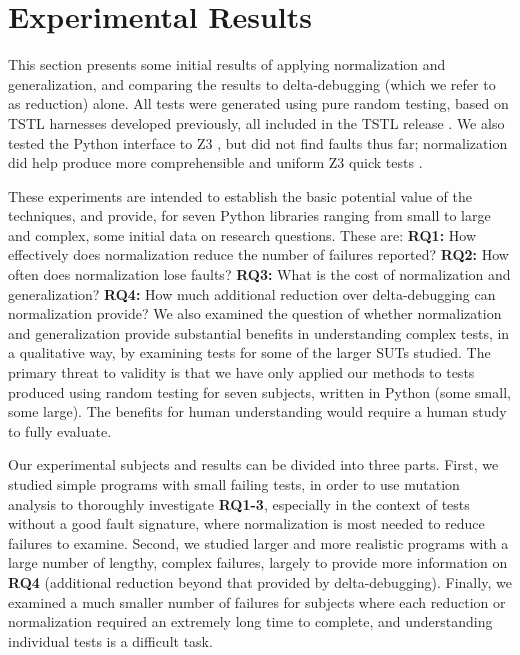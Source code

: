 \section {Experimental Results}

This section presents some initial results of applying normalization
and generalization, and comparing the results to delta-debugging 
(which we refer to as reduction) alone.  All tests were generated using pure random testing,
based on TSTL harnesses developed previously, all included in the
TSTL release \cite{tstl}.  We also tested the
Python interface to Z3 \cite{z3}, but did not find faults thus far;
normalization did help produce more comprehensible and uniform Z3
quick tests \cite{icst2014}.

These experiments are intended to establish the basic potential
value of
the techniques, and provide, for
seven Python libraries ranging from small to large and complex, some initial data on research questions.
These are:
{\bf RQ1:} How effectively does normalization reduce the number of
failures reported? {\bf RQ2:} How often does normalization lose
faults? {\bf RQ3:} What is the cost of normalization and generalization? {\bf RQ4:} How
much additional reduction over delta-debugging can normalization
provide? We also examined the question of whether normalization and generalization provide
substantial benefits in understanding complex tests, in a qualitative
way, by examining tests for some of the larger SUTs studied.
The primary
threat to validity is that we have only applied our methods  to tests produced using random testing for 
seven subjects, written in Python (some small, some large).  The
benefits for human understanding would require a human study to fully evaluate.

Our experimental subjects and results can be divided into three parts.  First, we studied simple programs
with small failing tests, in order to use mutation analysis to
thoroughly investigate {\bf RQ1-3}, especially in the context of tests
without a good fault signature, where normalization is most needed to
reduce failures to examine.  Second, we studied
larger and more realistic programs with a large number of lengthy,
complex failures, largely
to provide more information on {\bf RQ4} (additional reduction beyond
that provided by delta-debugging).  Finally, we examined a much smaller
number of failures for subjects where each reduction or normalization
required an extremely long time to complete, and understanding
individual tests is a difficult task.

